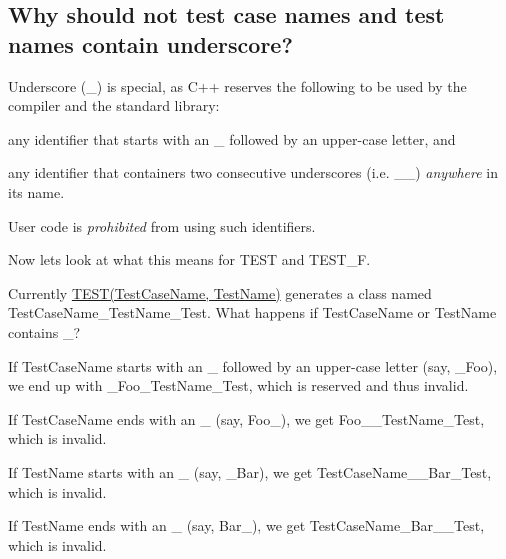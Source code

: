 \subsection*{Why should not test case names and test names contain underscore?}

Underscore ({\ttfamily \+\_\+}) is special, as C++ reserves the following to be used by the compiler and the standard library\+:


\begin{DoxyEnumerate}
\item any identifier that starts with an {\ttfamily \+\_\+} followed by an upper-\/case letter, and
\end{DoxyEnumerate}
\begin{DoxyEnumerate}
\item any identifier that containers two consecutive underscores (i.\+e. {\ttfamily \+\_\+\+\_\+}) {\itshape anywhere} in its name.
\end{DoxyEnumerate}

User code is {\itshape prohibited} from using such identifiers.

Now let\textquotesingle{}s look at what this means for {\ttfamily T\+E\+ST} and {\ttfamily T\+E\+S\+T\+\_\+F}.

Currently {\ttfamily \hyperlink{gtest_8h_ad8b332753515c0ab8baada563c2547eb}{T\+E\+S\+T(\+Test\+Case\+Name, Test\+Name)}} generates a class named {\ttfamily Test\+Case\+Name\+\_\+\+Test\+Name\+\_\+\+Test}. What happens if {\ttfamily Test\+Case\+Name} or {\ttfamily Test\+Name} contains {\ttfamily \+\_\+}?


\begin{DoxyEnumerate}
\item If {\ttfamily Test\+Case\+Name} starts with an {\ttfamily \+\_\+} followed by an upper-\/case letter (say, {\ttfamily \+\_\+\+Foo}), we end up with {\ttfamily \+\_\+\+Foo\+\_\+\+Test\+Name\+\_\+\+Test}, which is reserved and thus invalid.
\end{DoxyEnumerate}
\begin{DoxyEnumerate}
\item If {\ttfamily Test\+Case\+Name} ends with an {\ttfamily \+\_\+} (say, {\ttfamily Foo\+\_\+}), we get {\ttfamily Foo\+\_\+\+\_\+\+Test\+Name\+\_\+\+Test}, which is invalid.
\end{DoxyEnumerate}
\begin{DoxyEnumerate}
\item If {\ttfamily Test\+Name} starts with an {\ttfamily \+\_\+} (say, {\ttfamily \+\_\+\+Bar}), we get {\ttfamily Test\+Case\+Name\+\_\+\+\_\+\+Bar\+\_\+\+Test}, which is invalid.
\end{DoxyEnumerate}
\begin{DoxyEnumerate}
\item If {\ttfamily Test\+Name} ends with an {\ttfamily \+\_\+} (say, {\ttfamily Bar\+\_\+}), we get {\ttfamily Test\+Case\+Name\+\_\+\+Bar\+\_\+\+\_\+\+Test}, which is invalid.
\end{DoxyEnumerate}

